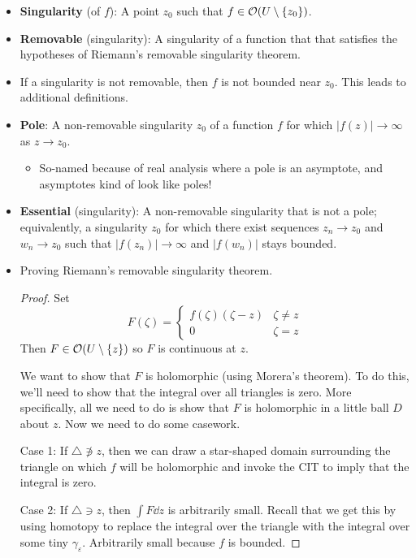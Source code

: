 \documentclass[../notes.tex]{subfiles}
\begin{document}
\begin{itemize}
\begin{itemize}
    \end{itemize}
    \item \textbf{Singularity} (of $f$): A point $z_0$ such that $f\in\mathcal{O}(U\setminus\{z_0\})$.
    \item \textbf{Removable} (singularity): A singularity of a function that that satisfies the hypotheses of Riemann's removable singularity theorem.
    \item If a singularity is not removable, then $f$ is not bounded near $z_0$. This leads to additional definitions.
    \item \textbf{Pole}: A non-removable singularity $z_0$ of a function $f$ for which $|f(z)|\to\infty$ as $z\to z_0$.
    \begin{itemize}
        \item So-named because of real analysis where a pole is an asymptote, and asymptotes kind of look like poles!
    \end{itemize}
    \item \textbf{Essential} (singularity): A non-removable singularity that is not a pole; equivalently, a singularity $z_0$ for which there exist sequences $z_n\to z_0$ and $w_n\to z_0$ such that $|f(z_n)|\to\infty$ and $|f(w_n)|$ stays bounded.
    \item Proving Riemann's removable singularity theorem.
    \begin{proof}
        Set
        \begin{equation*}
            F(\zeta) =
            \begin{cases}
                f(\zeta)(\zeta-z) & \zeta\neq z\\
                0 & \zeta=z
            \end{cases}
        \end{equation*}
        Then $F\in\mathcal{O}(U\setminus\{z\})$ so $F$ is continuous at $z$.\par
        We want to show that $F$ is holomorphic (using Morera's theorem). To do this, we'll need to show that the integral over all triangles is zero. More specifically, all we need to do is show that $F$ is holomorphic in a little ball $D$ about $z$. Now we need to do some casework.\par
        Case 1: If $\triangle\not\ni z$, then we can draw a star-shaped domain surrounding the triangle on which $f$ will be holomorphic and invoke the CIT to imply that the integral is zero.\par
        Case 2: If $\triangle\ni z$, then $\int F\dd{z}$ is arbitrarily small. Recall that we get this by using homotopy to replace the integral over the triangle with the integral over some tiny $\gamma_\varepsilon$. Arbitrarily small because $f$ is bounded.\par

\end{proof}
\end{itemize}
\end{document}
